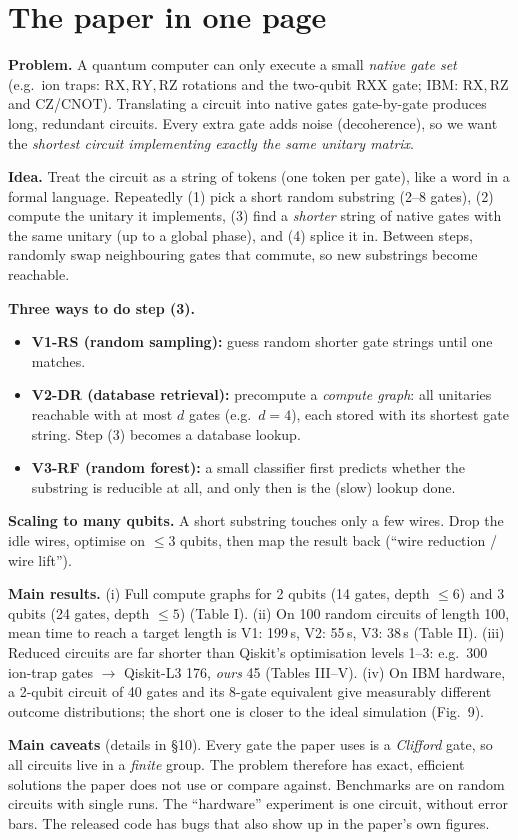 \documentclass[11pt,a4paper]{article}
\newcommand{\RX}{\mathrm{RX}}\newcommand{\RY}{\mathrm{RY}}\newcommand{\RZ}{\mathrm{RZ}}
\newcommand{\RXX}{\mathrm{RXX}}\newcommand{\CZ}{\mathrm{CZ}}\newcommand{\CNOT}{\mathrm{CNOT}}
\begin{document}
\section{The paper in one page}
\begin{tldr}
\textbf{Problem.} A quantum computer can only execute a small \emph{native gate set}
(e.g.\ ion traps: $\RX,\RY,\RZ$ rotations and the two-qubit $\RXX$ gate; IBM: $\RX,\RZ$ and $\CZ$/$\CNOT$).
Translating a circuit into native gates gate-by-gate produces long, redundant circuits. Every extra gate adds noise
(decoherence), so we want the \emph{shortest circuit implementing exactly the same unitary matrix}.

\textbf{Idea.} Treat the circuit as a string of tokens (one token per gate), like a word in a formal language.
Repeatedly (1) pick a short random substring (2--8 gates), (2) compute the unitary it implements, (3) find a
\emph{shorter} string of native gates with the same unitary (up to a global phase), and (4) splice it in.
Between steps, randomly swap neighbouring gates that commute, so new substrings become reachable.

\textbf{Three ways to do step (3).}
\begin{itemize}[nosep]
\item \textbf{V1-RS (random sampling):} guess random shorter gate strings until one matches.
\item \textbf{V2-DR (database retrieval):} precompute a \emph{compute graph}: all unitaries reachable with at most
  $d$ gates (e.g.\ $d=4$), each stored with its shortest gate string. Step (3) becomes a database lookup.
\item \textbf{V3-RF (random forest):} a small classifier first predicts whether the substring is reducible at all,
  and only then is the (slow) lookup done.
\end{itemize}
\textbf{Scaling to many qubits.} A short substring touches only a few wires. Drop the idle wires, optimise on
$\le 3$ qubits, then map the result back (``wire reduction / wire lift'').

\textbf{Main results.} (i) Full compute graphs for 2 qubits (14 gates, depth $\le 6$) and 3 qubits (24 gates, depth $\le 5$)
(Table I). (ii) On 100 random circuits of length 100, mean time to reach a target length is
V1: 199\,s, V2: 55\,s, V3: 38\,s (Table II). (iii) Reduced circuits are far shorter than Qiskit's optimisation
levels 1--3: e.g.\ 300 ion-trap gates $\to$ Qiskit-L3 176, \emph{ours} 45 (Tables III--V). (iv) On IBM hardware, a
2-qubit circuit of 40 gates and its 8-gate equivalent give measurably different outcome distributions; the short
one is closer to the ideal simulation (Fig.~9).

\textbf{Main caveats} (details in \S10). Every gate the paper uses is a \emph{Clifford} gate, so all circuits live in
a \emph{finite} group. The problem therefore has exact, efficient solutions the paper does not use or compare against.
Benchmarks are on random circuits with single runs. The ``hardware'' experiment is one circuit, without error bars.
The released code has bugs that also show up in the paper's own figures.
\end{tldr}
\end{document}
